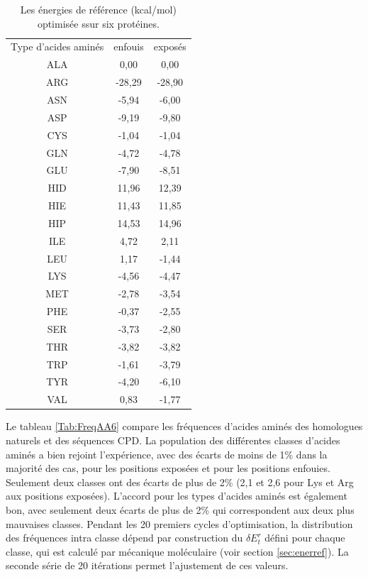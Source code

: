     \begin{table}[!htbp]
      \centering
      \caption{Les énergies de référence (kcal/mol) optimisée ssur six protéines.}
      \begin{tabular}{ccc}

        \toprule
        Type d'acides aminés & enfouis & exposés \\
        \cmidrule{1-3}

        ALA & 0,00     &  0,00     \\
        ARG & -28,29   &  -28,90   \\
        ASN & -5,94    &  -6,00    \\
        ASP & -9,19    &  -9,80    \\
        CYS & -1,04    &  -1,04    \\
        GLN & -4,72    &  -4,78    \\
        GLU & -7,90    &  -8,51    \\
        HID & 11,96    &  12,39    \\
        HIE & 11,43    &  11,85    \\
        HIP & 14,53    &  14,96    \\
        ILE & 4,72     &  2,11     \\
        LEU & 1,17     &  -1,44    \\
        LYS & -4,56    &  -4,47    \\
        MET & -2,78    &  -3,54    \\
        PHE & -0,37    &  -2,55    \\
        SER & -3,73    &  -2,80    \\
        THR & -3,82    &  -3,82    \\
        TRP & -1,61    &  -3,79    \\
        TYR & -4,20    &  -6,10    \\
        VAL & 0,83     &  -1,77    \\

        \bottomrule
      \end{tabular}      

\label{tab:RefEner6}      
    \end{table}

Le tableau \ref{Tab:FreqAA6} compare les fréquences d'acides aminés des homologues naturels et des séquences CPD. La population des différentes classes d'acides aminés a bien rejoint l'expérience, avec des écarts de moins de 1\% dans la majorité des cas, pour les positions exposées et pour les positions enfouies. Seulement deux classes ont des écarts de plus de 2\% (2,1 et 2,6 pour Lys et Arg aux positions exposées). L'accord pour les types d'acides aminés est également bon, avec seulement deux écarts de plus de 2\% qui correspondent aux deux plus mauvaises classes. Pendant les 20 premiers cycles d'optimisation, la distribution des fréquences intra classe dépend par construction du $\delta E_t^r$ défini pour chaque classe, qui est calculé par mécanique moléculaire (voir section \ref{sec:enerref}). La seconde série de 20 itérations permet l'ajustement de ces valeurs. 
    

